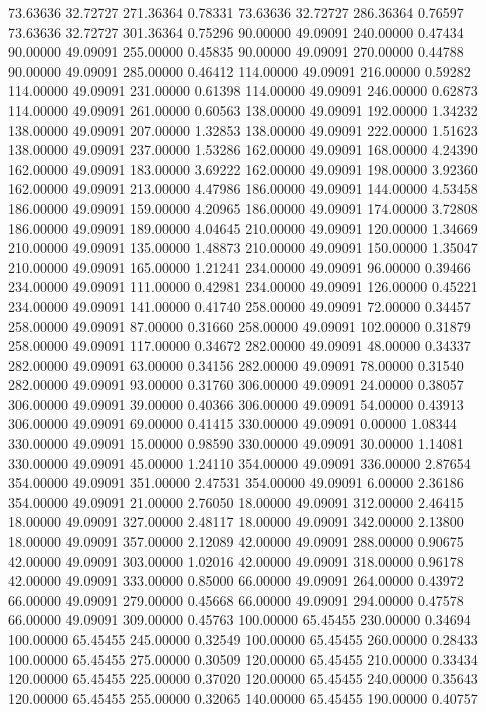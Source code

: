 73.63636 32.72727 271.36364 0.78331
73.63636 32.72727 286.36364 0.76597
73.63636 32.72727 301.36364 0.75296
90.00000 49.09091 240.00000 0.47434
90.00000 49.09091 255.00000 0.45835
90.00000 49.09091 270.00000 0.44788
90.00000 49.09091 285.00000 0.46412
114.00000 49.09091 216.00000 0.59282
114.00000 49.09091 231.00000 0.61398
114.00000 49.09091 246.00000 0.62873
114.00000 49.09091 261.00000 0.60563
138.00000 49.09091 192.00000 1.34232
138.00000 49.09091 207.00000 1.32853
138.00000 49.09091 222.00000 1.51623
138.00000 49.09091 237.00000 1.53286
162.00000 49.09091 168.00000 4.24390
162.00000 49.09091 183.00000 3.69222
162.00000 49.09091 198.00000 3.92360
162.00000 49.09091 213.00000 4.47986
186.00000 49.09091 144.00000 4.53458
186.00000 49.09091 159.00000 4.20965
186.00000 49.09091 174.00000 3.72808
186.00000 49.09091 189.00000 4.04645
210.00000 49.09091 120.00000 1.34669
210.00000 49.09091 135.00000 1.48873
210.00000 49.09091 150.00000 1.35047
210.00000 49.09091 165.00000 1.21241
234.00000 49.09091 96.00000 0.39466
234.00000 49.09091 111.00000 0.42981
234.00000 49.09091 126.00000 0.45221
234.00000 49.09091 141.00000 0.41740
258.00000 49.09091 72.00000 0.34457
258.00000 49.09091 87.00000 0.31660
258.00000 49.09091 102.00000 0.31879
258.00000 49.09091 117.00000 0.34672
282.00000 49.09091 48.00000 0.34337
282.00000 49.09091 63.00000 0.34156
282.00000 49.09091 78.00000 0.31540
282.00000 49.09091 93.00000 0.31760
306.00000 49.09091 24.00000 0.38057
306.00000 49.09091 39.00000 0.40366
306.00000 49.09091 54.00000 0.43913
306.00000 49.09091 69.00000 0.41415
330.00000 49.09091 0.00000 1.08344
330.00000 49.09091 15.00000 0.98590
330.00000 49.09091 30.00000 1.14081
330.00000 49.09091 45.00000 1.24110
354.00000 49.09091 336.00000 2.87654
354.00000 49.09091 351.00000 2.47531
354.00000 49.09091 6.00000 2.36186
354.00000 49.09091 21.00000 2.76050
18.00000 49.09091 312.00000 2.46415
18.00000 49.09091 327.00000 2.48117
18.00000 49.09091 342.00000 2.13800
18.00000 49.09091 357.00000 2.12089
42.00000 49.09091 288.00000 0.90675
42.00000 49.09091 303.00000 1.02016
42.00000 49.09091 318.00000 0.96178
42.00000 49.09091 333.00000 0.85000
66.00000 49.09091 264.00000 0.43972
66.00000 49.09091 279.00000 0.45668
66.00000 49.09091 294.00000 0.47578
66.00000 49.09091 309.00000 0.45763
100.00000 65.45455 230.00000 0.34694
100.00000 65.45455 245.00000 0.32549
100.00000 65.45455 260.00000 0.28433
100.00000 65.45455 275.00000 0.30509
120.00000 65.45455 210.00000 0.33434
120.00000 65.45455 225.00000 0.37020
120.00000 65.45455 240.00000 0.35643
120.00000 65.45455 255.00000 0.32065
140.00000 65.45455 190.00000 0.40757
